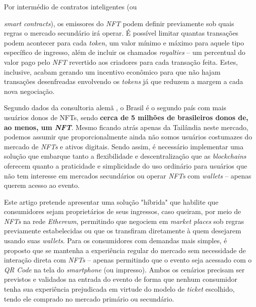 Por intermédio de contratos inteligentes (ou {\textit{smart contracts}), os emissores do \textit{NFT} podem definir previamente sob quais regras o mercado secundário irá operar. É possível limitar quantas transações podem acontecer para cada \textit{token}, um valor mínimo e máximo para aquele tipo específico de ingresso, além de incluir os chamados \textit{royalties} -- um percentual do valor pago pelo \textit{NFT} revertido aos criadores para cada transação feita. Estes, inclusive, acabam gerando um incentivo econômico para que não hajam transações desenfreadas envolvendo os \textit{tokens} já que reduzem a margem a cada nova negociação.

Segundo dados da consultoria alemã , o Brasil é o segundo país com mais usuários donos de NFTs, sendo \textbf{cerca de 5 milhões de brasileiros donos de, ao menos, um \textit{NFT}}. Mesmo ficando atrás apenas da Tailândia neste mercado, podemos assumir que proporcionalmente ainda não somos usuários costumazes do mercado de \textit{NFTs} e ativos digitais. Sendo assim, é necessário implementar uma solução que embarque tanto a flexibilidade e descentralização que as \textit{blockchains} oferecem quanto a praticidade e simplicidade do uso ordinário para usuários que não tem interesse em mercados secundários ou operar \textit{NFTs} com \textit{wallets} -- apenas querem acesso ao evento.


Este artigo pretende apresentar uma solução "híbrida" que habilite que consumidores sejam proprietários de seus ingressos, caso queiram, por meio de \textit{NFTs} na rede \textit{Ethereum}, permitindo que negociem em \textit{market places} sob regras previamente estabelecidas ou que os transfiram diretamente à quem desejarem usando suas \textit{wallets}. Para os consumidores com demandas mais simples, é proposto que se mantenha a experiência regular do mercado sem necessidade de interação direta com \textit{NFTs} -- apenas permitindo que o evento seja acessado com o \textit{QR Code} na tela do \textit{smartphone} (ou impresso). Ambos os cenários precisam ser previstos e validados na entrada do evento de forma que nenhum consumidor tenha sua experiência prejudicada em virtude do modelo de \textit{ticket} escolhido, tendo ele comprado no mercado primário ou secundário.

}
